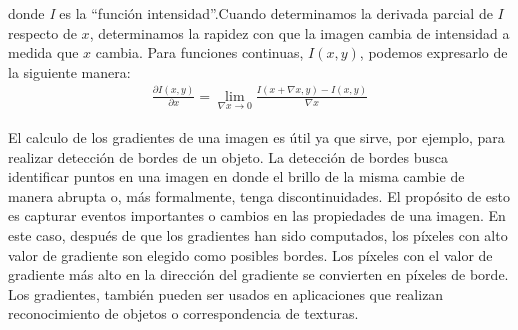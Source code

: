 	donde \textit{I} es la ``función intensidad''.Cuando determinamos la derivada parcial de $I$ respecto de $x$, determinamos la rapidez con que la imagen cambia de intensidad a medida que $x$ cambia. Para funciones continuas, $I(x,y)$, podemos expresarlo de la siguiente manera:
	\begin{align}
		\frac{\partial I(x,y)}{\partial x} = \lim_{\nabla x\rightarrow 0} \frac{I(x + \nabla x, y) - I(x,y)}{\nabla x}	
	\end{align}
	
	 El calculo de los gradientes de una imagen es útil ya que sirve, por ejemplo, para realizar detección de bordes de un objeto. La detección de bordes busca identificar puntos en una imagen en donde el brillo de la misma cambie de manera abrupta o, más formalmente, tenga discontinuidades. El propósito de esto es capturar eventos importantes o cambios en las propiedades de una imagen. En este caso, después de que los gradientes han sido computados, los píxeles con alto valor de gradiente son elegido como posibles bordes. Los píxeles con el valor de gradiente más alto en la dirección del gradiente se convierten en píxeles de borde. Los gradientes, también pueden ser usados en aplicaciones que realizan reconocimiento de objetos o correspondencia de texturas.


